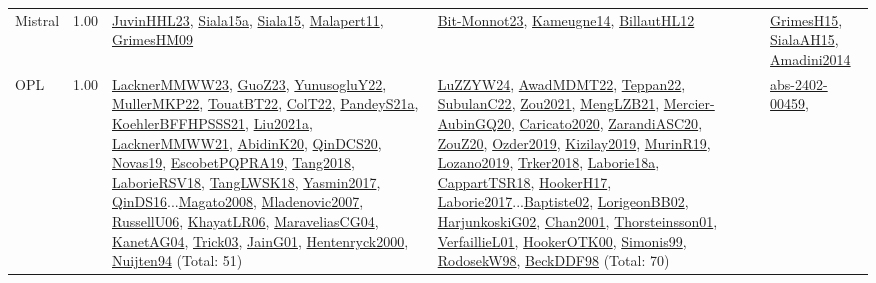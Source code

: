 {\begin{longtable}{p{3cm}r>{\raggedright\arraybackslash}p{6cm}>{\raggedright\arraybackslash}p{6cm}>{\raggedright\arraybackslash}p{8cm}}
\index{Mistral}\index{CPSystems!Mistral}Mistral &  1.00 & \hyperref[detail:JuvinHHL23]{JuvinHHL23}, \hyperref[detail:Siala15a]{Siala15a}, \hyperref[detail:Siala15]{Siala15}, \hyperref[detail:Malapert11]{Malapert11}, \hyperref[detail:GrimesHM09]{GrimesHM09} & \hyperref[detail:Bit-Monnot23]{Bit-Monnot23}, \hyperref[detail:Kameugne14]{Kameugne14}, \hyperref[detail:BillautHL12]{BillautHL12} & \hyperref[detail:GrimesH15]{GrimesH15}, \hyperref[detail:SialaAH15]{SialaAH15}, \hyperref[detail:Amadini2014]{Amadini2014}\\
\index{OPL}\index{CPSystems!OPL}OPL &  1.00 & \hyperref[detail:LacknerMMWW23]{LacknerMMWW23}, \hyperref[detail:GuoZ23]{GuoZ23}, \hyperref[detail:YunusogluY22]{YunusogluY22}, \hyperref[detail:MullerMKP22]{MullerMKP22}, \hyperref[detail:TouatBT22]{TouatBT22}, \hyperref[detail:ColT22]{ColT22}, \hyperref[detail:PandeyS21a]{PandeyS21a}, \hyperref[detail:KoehlerBFFHPSSS21]{KoehlerBFFHPSSS21}, \hyperref[detail:Liu2021a]{Liu2021a}, \hyperref[detail:LacknerMMWW21]{LacknerMMWW21}, \hyperref[detail:AbidinK20]{AbidinK20}, \hyperref[detail:QinDCS20]{QinDCS20}, \hyperref[detail:Novas19]{Novas19}, \hyperref[detail:EscobetPQPRA19]{EscobetPQPRA19}, \hyperref[detail:Tang2018]{Tang2018}, \hyperref[detail:LaborieRSV18]{LaborieRSV18}, \hyperref[detail:TangLWSK18]{TangLWSK18}, \hyperref[detail:Yasmin2017]{Yasmin2017}, \hyperref[detail:QinDS16]{QinDS16}...\hyperref[detail:Magato2008]{Magato2008}, \hyperref[detail:Mladenovic2007]{Mladenovic2007}, \hyperref[detail:RussellU06]{RussellU06}, \hyperref[detail:KhayatLR06]{KhayatLR06}, \hyperref[detail:MaraveliasCG04]{MaraveliasCG04}, \hyperref[detail:KanetAG04]{KanetAG04}, \hyperref[detail:Trick03]{Trick03}, \hyperref[detail:JainG01]{JainG01}, \hyperref[detail:Hentenryck2000]{Hentenryck2000}, \hyperref[detail:Nuijten94]{Nuijten94} (Total: 51) & \hyperref[detail:LuZZYW24]{LuZZYW24}, \hyperref[detail:AwadMDMT22]{AwadMDMT22}, \hyperref[detail:Teppan22]{Teppan22}, \hyperref[detail:SubulanC22]{SubulanC22}, \hyperref[detail:Zou2021]{Zou2021}, \hyperref[detail:MengLZB21]{MengLZB21}, \hyperref[detail:Mercier-AubinGQ20]{Mercier-AubinGQ20}, \hyperref[detail:Caricato2020]{Caricato2020}, \hyperref[detail:ZarandiASC20]{ZarandiASC20}, \hyperref[detail:ZouZ20]{ZouZ20}, \hyperref[detail:Ozder2019]{Ozder2019}, \hyperref[detail:Kizilay2019]{Kizilay2019}, \hyperref[detail:MurinR19]{MurinR19}, \hyperref[detail:Lozano2019]{Lozano2019}, \hyperref[detail:Trker2018]{Trker2018}, \hyperref[detail:Laborie18a]{Laborie18a}, \hyperref[detail:CappartTSR18]{CappartTSR18}, \hyperref[detail:HookerH17]{HookerH17}, \hyperref[detail:Laborie2017]{Laborie2017}...\hyperref[detail:Baptiste02]{Baptiste02}, \hyperref[detail:LorigeonBB02]{LorigeonBB02}, \hyperref[detail:HarjunkoskiG02]{HarjunkoskiG02}, \hyperref[detail:Chan2001]{Chan2001}, \hyperref[detail:Thorsteinsson01]{Thorsteinsson01}, \hyperref[detail:VerfaillieL01]{VerfaillieL01}, \hyperref[detail:HookerOTK00]{HookerOTK00}, \hyperref[detail:Simonis99]{Simonis99}, \hyperref[detail:RodosekW98]{RodosekW98}, \hyperref[detail:BeckDDF98]{BeckDDF98} (Total: 70) & \hyperref[detail:abs-2402-00459]{abs-2402-00459}, 
\end{longtable}}
